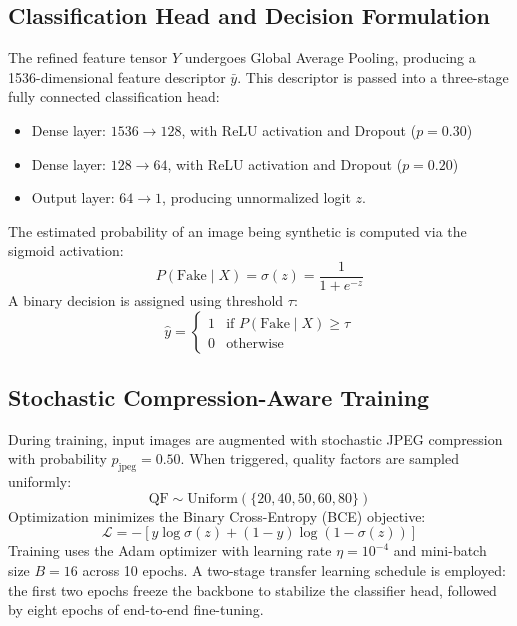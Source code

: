 \documentclass[conference]{IEEEtran}
\begin{document}
\subsection{Classification Head and Decision Formulation}
The refined feature tensor $Y$ undergoes Global Average Pooling, producing a 1536-dimensional feature descriptor $\bar{y}$. This descriptor is passed into a three-stage fully connected classification head:
\begin{itemize}
    \item Dense layer: $1536 \to 128$, with ReLU activation and Dropout ($p = 0.30$)
    \item Dense layer: $128 \to 64$, with ReLU activation and Dropout ($p = 0.20$)
    \item Output layer: $64 \to 1$, producing unnormalized logit $z$.
\end{itemize}
The estimated probability of an image being synthetic is computed via the sigmoid activation:
\begin{equation}
P(\text{Fake} \mid X) = \sigma(z) = \frac{1}{1 + e^{-z}}
\end{equation}
A binary decision is assigned using threshold $\tau$:
\begin{equation}
\hat{y} = \begin{cases} 1 & \text{if } P(\text{Fake} \mid X) \ge \tau \\ 0 & \text{otherwise} \end{cases}
\end{equation}

\subsection{Stochastic Compression-Aware Training}
During training, input images are augmented with stochastic JPEG compression with probability $p_{\text{jpeg}} = 0.50$. When triggered, quality factors are sampled uniformly:
\begin{equation}
\text{QF} \sim \text{Uniform}(\{20, 40, 50, 60, 80\})
\end{equation}
Optimization minimizes the Binary Cross-Entropy (BCE) objective:
\begin{equation}
\mathcal{L} = - [y \log \sigma(z) + (1 - y) \log (1 - \sigma(z))]
\end{equation}
Training uses the Adam optimizer with learning rate $\eta = 10^{-4}$ and mini-batch size $B = 16$ across 10 epochs. A two-stage transfer learning schedule is employed: the first two epochs freeze the backbone to stabilize the classifier head, followed by eight epochs of end-to-end fine-tuning.
\end{document}
